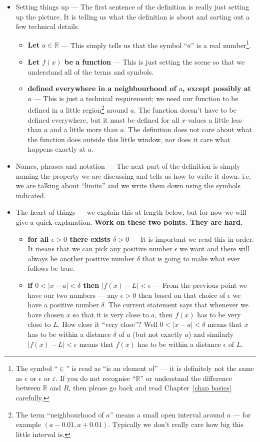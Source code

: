 \begin{itemize}
 \item Setting things up --- The first sentence of the definition is really
just setting up the picture. It is telling us what the definition is about and
sorting out a few technical details.
\begin{itemize}
 \item \textbf{Let $a \in \mathbb{R}$} --- This simply tells us that the symbol
``$a$'' is a real number\footnote{The symbol ``$\in$'' is read as ``is an
element of'' --- it is definitely not the same as $e$ or $\epsilon$ or
$\varepsilon$. If you do not recognise ``$\mathbb{R}$'' or understand the
difference between $\mathbb{R}$ and $R$, then please go back and read Chapter~\ref{chap
basics} carefully.}.
 \item \textbf{Let $f(x)$ be a function} --- This is just setting the scene so
that we understand all of the terms and symbols.
 \item \textbf{defined everywhere in a neighbourhood of $a$, except possibly at
$a$} --- This is just a technical requirement; we need our function to be
defined in a little region\footnote{The term ``neighbourhood of $a$'' means a
small open interval around $a$ --- for example $(a-0.01, a+0.01)$. Typically
we don't really care how big this little interval is.} around $a$. The
function doesn't have to be defined everywhere, but it must be defined for all
$x$-values a little less than $a$ and a little more than $a$. The definition
does not care about what the function does outside this little window, nor does
it care what happens exactly at $a$.
\end{itemize}
\item Names, phrases and notation --- The next part of the definition is simply
naming the property we are discussing and tells us how to write it down. i.e. we
are talking about ``limits'' and we write them down using the symbols
indicated.
\item The heart of things --- we explain this at length below, but for now we
will give a quick explanation. \textbf{Work on these two points. They are hard.}
  \begin{itemize}
   \item \textbf{for all $\epsilon>0$ there exists $\delta >0$} --- It is
important we read this in order. It means that we can pick any positive number
$\epsilon$ we want and there will always be another positive number $\delta$
that is going to make what ever follows be true.
   \item \textbf{if $0<|x-a|<\delta$ then $|f(x)-L|<\epsilon$} --- From the
previous point we have our two numbers --- any $\epsilon >0$ then based on that
choice of $\epsilon$ we have a positive number $\delta$. The current statement
says that whenever we have chosen $x$ so that it is very close to $a$, then
$f(x)$ has to be very close to $L$. How close it ``very close''? Well
$0<|x-a|<\delta$ means that $x$ has to be within a distance $\delta$ of $a$
(but not exactly $a$) and similarly $|f(x)-L|<\epsilon$ means that $f(x)$ has
to
be within a distance $\epsilon$ of $L$.
  \end{itemize}
\end{itemize}
